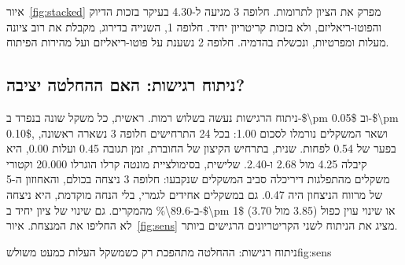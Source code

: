 איור~\ref{fig:stacked} מפרק את הציון לתרומות. חלופה \num{3} מגיעה ל-\num{4.30} בעיקר בזכות הדיוק והפוטו-ריאליזם, ולא בזכות קריטריון יחיד. חלופה \num{1}, השנייה בדירוג, מקבלת את רוב ציונה מעלות ומפרטיות, ונכשלת בהדמיה. חלופה \num{2} נשענת על פוטו-ריאליזם ועל מהירות הפיתוח.

\subsection{ניתוח רגישות: האם ההחלטה יציבה?}
ניתוח הרגישות נעשה בשלוש רמות. ראשית, כל משקל שונה בנפרד ב-\num{$\pm 0.05$} וב-\num{$\pm 0.10$}, ושאר המשקלים נורמלו לסכום \num{1.00}: בכל \num{24} התרחישים חלופה \num{3} נשארה ראשונה, בפער של \num{0.54} לפחות. שנית, בתרחיש הקיצון של החוברת, זמן תגובה \num{0.45} ועלות \num{0.00}, היא קיבלה \num{4.25} מול \num{2.68} ו-\num{2.40}. שלישית, בסימולציית מונטה קרלו הוגרלו \num{20,000} וקטורי משקלים מהתפלגות דיריכלה סביב המשקלים שנקבעו: חלופה \num{3} ניצחה בכולם, והאחוזון ה-\num{5} של מרווח הניצחון היה \num{0.47}. גם במשקלים אחידים לגמרי, בלי הנחה מוקדמת, היא ניצחה ב-\num{89.6\%} מהמקרים. גם שינוי של ציון יחיד ב-\num{$\pm 1$} או שינוי עוין כפול (\num{3.85} מול \num{3.70}) לא החליפו את המנצחת. איור~\ref{fig:sens} מציג את הניתוח לשני הקריטריונים הרגישים ביותר.

\begin{reportfigure}{ניתוח רגישות: ההחלטה מתהפכת רק כשמשקל העלות כמעט משולש}{fig:sens}
\end{reportfigure}

